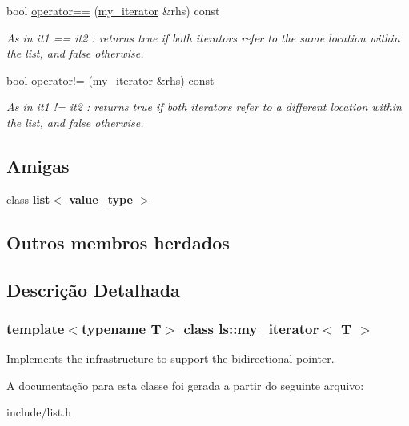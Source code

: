 \begin{DoxyCompactItemize}
\mbox{\label{classls_1_1my__iterator_a7582cc03e5885a77599f509dd06bb0cf}} 
bool \hyperlink{classls_1_1my__iterator_a7582cc03e5885a77599f509dd06bb0cf}{operator==} (\hyperlink{classls_1_1my__iterator}{my\+\_\+iterator} \&rhs) const
\begin{DoxyCompactList}\small\item\em As in it1 == it2 \+: returns true if both iterators refer to the same location within the list, and false otherwise. \end{DoxyCompactList}\item 
\mbox{\label{classls_1_1my__iterator_a57a517f86159fc752b74b06a73fdfa68}} 
bool \hyperlink{classls_1_1my__iterator_a57a517f86159fc752b74b06a73fdfa68}{operator!=} (\hyperlink{classls_1_1my__iterator}{my\+\_\+iterator} \&rhs) const
\begin{DoxyCompactList}\small\item\em As in it1 != it2 \+: returns true if both iterators refer to a different location within the list, and false otherwise. \end{DoxyCompactList}\end{DoxyCompactItemize}
\subsection*{Amigas}
\begin{DoxyCompactItemize}
\item 
\mbox{\label{classls_1_1my__iterator_aa4cf6f043abfca0b41eb074c92dac6fa}} 
class {\bfseries list$<$ value\+\_\+type $>$}
\end{DoxyCompactItemize}
\subsection*{Outros membros herdados}


\subsection{Descrição Detalhada}
\subsubsection*{template$<$typename T$>$\newline
class ls\+::my\+\_\+iterator$<$ T $>$}

Implements the infrastructure to support the bidirectional pointer. 

A documentação para esta classe foi gerada a partir do seguinte arquivo\+:\begin{DoxyCompactItemize}
\item 
include/list.\+h\end{DoxyCompactItemize}
